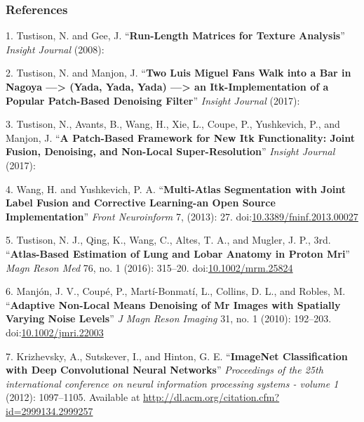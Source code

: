 \documentclass[11pt,]{article}
\begin{document}
\newpage

\hypertarget{references}{%
\subsubsection*{References}\label{references}}

\hypertarget{refs}{}
\leavevmode\hypertarget{ref-tustison2008}{}%
1. Tustison, N. and Gee, J. ``\textbf{Run-Length Matrices for Texture
Analysis}'' \emph{Insight Journal} (2008):

\leavevmode\hypertarget{ref-tustison2017a}{}%
2. Tustison, N. and Manjon, J. ``\textbf{Two Luis Miguel Fans Walk into
a Bar in Nagoya ---\textgreater{} (Yada, Yada, Yada) ---\textgreater{}
an Itk-Implementation of a Popular Patch-Based Denoising Filter}''
\emph{Insight Journal} (2017):

\leavevmode\hypertarget{ref-tustison2017b}{}%
3. Tustison, N., Avants, B., Wang, H., Xie, L., Coupe, P., Yushkevich,
P., and Manjon, J. ``\textbf{A Patch-Based Framework for New Itk
Functionality: Joint Fusion, Denoising, and Non-Local
Super-Resolution}'' \emph{Insight Journal} (2017):

\leavevmode\hypertarget{ref-Wang:2013aa}{}%
4. Wang, H. and Yushkevich, P. A. ``\textbf{Multi-Atlas Segmentation
with Joint Label Fusion and Corrective Learning-an Open Source
Implementation}'' \emph{Front Neuroinform} 7, (2013): 27.
doi:\href{https://doi.org/10.3389/fninf.2013.00027}{10.3389/fninf.2013.00027}

\leavevmode\hypertarget{ref-Tustison:2016aa}{}%
5. Tustison, N. J., Qing, K., Wang, C., Altes, T. A., and Mugler, J. P.,
3rd. ``\textbf{Atlas-Based Estimation of Lung and Lobar Anatomy in
Proton Mri}'' \emph{Magn Reson Med} 76, no. 1 (2016): 315--20.
doi:\href{https://doi.org/10.1002/mrm.25824}{10.1002/mrm.25824}

\leavevmode\hypertarget{ref-Manjon:2010aa}{}%
6. Manjón, J. V., Coupé, P., Martí-Bonmatí, L., Collins, D. L., and
Robles, M. ``\textbf{Adaptive Non-Local Means Denoising of Mr Images
with Spatially Varying Noise Levels}'' \emph{J Magn Reson Imaging} 31,
no. 1 (2010): 192--203.
doi:\href{https://doi.org/10.1002/jmri.22003}{10.1002/jmri.22003}

\leavevmode\hypertarget{ref-Krizhevsky:2012}{}%
7. Krizhevsky, A., Sutskever, I., and Hinton, G. E. ``\textbf{ImageNet
Classification with Deep Convolutional Neural Networks}''
\emph{Proceedings of the 25th international conference on neural
information processing systems - volume 1} (2012): 1097--1105. Available
at \url{http://dl.acm.org/citation.cfm?id=2999134.2999257}
\end{document}
